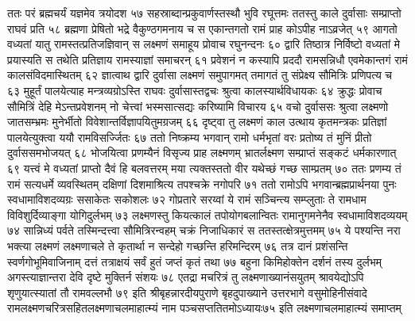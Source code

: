 ततः परं ब्रह्मचर्यं यज्ञमेव त्रयोदश ५७
सहस्राब्दान्प्रकुवार्णस्तस्थौ भुवि रघूत्तमः
ततस्तु काले दुर्वासाः सम्प्राप्तो राघवं प्रति ५८
ब्रह्मणा प्रेषितो भद्रे वैकुण्ठगमनाय च
स एकान्तगतो रामं प्राह कोऽपीह नाऽव्रजेत् ५९
आगतो वध्यतां यातु रामस्तत्प्रतिजज्ञिवान्
स लक्ष्मणं समाहूय प्रोवाच रघुनन्दनः ६०
द्वारि तिष्ठात्र निर्विष्टो वध्यतां मे प्रयास्यति
स तथेति प्रतिज्ञाय रामस्याज्ञां समाचरन् ६१
प्रवेशनं न कस्यापि प्रददौ रामसन्निधौ
एवमेकान्तगं रामं कालसंविदमास्थितम् ६२
ज्ञात्वाथ द्वारि दुर्वासा लक्ष्मणं समुपागमत्
तमागतं तु संप्रेक्ष्य सौमित्रिः प्रणिपत्य च ६३
मुहूर्तं पालयेत्याह मन्त्रव्यग्रोऽस्ति राघवः
दुर्वासास्तद्वचः श्रुत्वा कालस्यार्थविधायकः ६४
क्रुद्धः प्रोवाच सौमित्रिं देहि मेऽन्तप्रवेशनम्
नो चेत्त्वां भस्मसात्सद्यः करिष्यामि विचारय ६५
वचो दुर्वाससः श्रुत्वा लक्ष्मणो जातसम्भ्रमः
मुनेर्भीतो विवेशान्तर्विज्ञापयितुमग्रजम् ६६
दृष्ट्वा तु लक्ष्मणं काल उत्थाय कृतमन्त्रकः
प्रतिज्ञां पालयेत्युक्त्वा ययौ रामविसर्ज्जितः ६७
ततो निष्क्रम्य भगवान् रामो धर्मभृतां वरः
प्रतोष्य तं मुनिं प्रीतो दुर्वाससमभोजयत् ६८
भोजयित्वा प्रणम्यैनं विसृज्य प्राह लक्ष्मणम्
भ्रातर्लक्ष्मण सम्प्राप्तं सङ्कटं धर्मकारणात् ६९
यत्त्वं मे वध्यतां प्राप्तो दैवं हि बलवत्तरम्
मया त्यक्तस्ततो वीर यथेच्छं गच्छ साम्प्रतम् ७०
ततः प्रणम्य तं रामं सत्यधर्मे व्यवस्थितम्
दक्षिणां दिशमाश्रित्य तपश्चक्रे नगोपरि ७१
ततो रामोऽपि भगवान्ब्रह्मप्रार्थनया पुनः
स्वधामाविशदव्यग्रः ससाकेतः सकोशलः ७२
गोप्रतारे सरय्वां ये रामं सञ्चिन्त्य सम्प्लुताः
ते रामधाम विविशुर्दिव्याङ्गा योगिदुर्लभम् ७३
लक्ष्मणस्तु कियत्कालं तपोयोगबलान्वितः
रामानुगमनेनैव स्वधामाविशदव्ययम् ७४
सान्निध्यं पर्वते तस्मिन्दत्त्वा सौमित्रिरन्वहम्
चक्रं निजाधिकारं स ततस्तत्क्षेत्रमुत्तमम् ७५
ये पश्यन्ति नरा भक्त्या लक्ष्मणं लक्ष्मणाचले
ते कृतार्था न सन्देहो गच्छन्ति हरिमन्दिरम् ७६
तत्र दानं प्रशंसन्ति स्वर्णगोभूमिवाजिनाम्
दत्तं तत्राक्षयं सर्वं हुतं जप्तं कृतं तथा ७७
बहुना किमिहोक्तेन दर्शनं तस्य दुर्लभम्
अगस्त्याज्ञान्तरा देवि दृष्टे मुक्तिर्न संशयः ७८
एतद्रा मचरित्रं तु लक्ष्मणाख्यानंसयुतम्
श्रावयेद्योऽपि शृणुयात्स्यातां तौ रामवल्लभौ ७९
इति श्रीबृहन्नारदीयपुराणे बृहदुपाख्याने उत्तरभागे वसुमोहिनीसंवादे
रामलक्ष्मणचरित्रसहितलक्ष्मणाचलमाहात्म्यं नाम पञ्चसप्ततितमोऽध्यायः७५
इति लक्ष्मणाचलमाहात्म्यं समाप्तम्